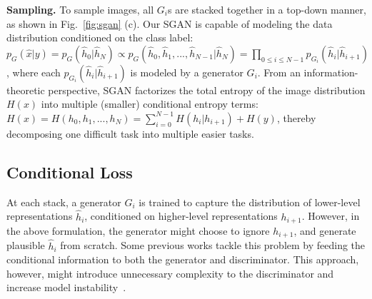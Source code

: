 \documentclass[10pt,twocolumn,letterpaper]{article}
\newcommand{\vpara}[1]{\vspace{0.1in}\noindent\textbf{#1}}
\begin{document}
\vpara{Sampling.} To sample images, all $G_{i}$s are stacked together in a top-down manner, as shown in Fig.~\ref{fig:sgan} (c). 
Our SGAN is capable of modeling the data distribution conditioned on the class label: $p_{G}(\hat{x}|y) = p_{G}(\hat{h}_{0}|\hat{h}_{N}) \propto p_{G}(\hat{h}_{0}, \hat{h}_{1}, ..., \hat{h}_{N-1}|\hat{h}_{N}) = \prod\limits_{0\leq i \leq N-1 } p_{G_{i}}(\hat{h}_{i}| \hat{h}_{i+1})$, where each $p_{G_{i}}(\hat{h}_{i}| \hat{h}_{i+1})$ is modeled by a generator $G_{i}$. %
From an information-theoretic perspective, SGAN factorizes the total entropy of the image distribution $H(x)$ into multiple (smaller) conditional entropy terms: $H(x) = H(h_{0}, h_{1}, ..., h_{N}) = \sum_{i=0}^{N-1}H(h_{i}|h_{i+1}) + H(y)$, thereby decomposing one difficult task into multiple easier tasks.


\subsection{Conditional Loss}
\label{Condloss}
At each stack, a generator $G_{i}$ is trained to capture the distribution of lower-level representations $\hat{h}_{i}$, conditioned on higher-level representations $h_{i+1}$. However, in the above formulation,
the generator might choose to ignore $h_{i+1}$, and generate plausible $\hat{h}_{i}$ from scratch. Some previous works \cite{mirza2014conditional, gauthier2014conditional,denton2015deep} tackle this problem by feeding the conditional information to both the generator and discriminator. This approach, however, might introduce unnecessary complexity to the discriminator and increase model instability~\cite{pathak2016context,sangkloy2016scribbler}.  
\end{document}
